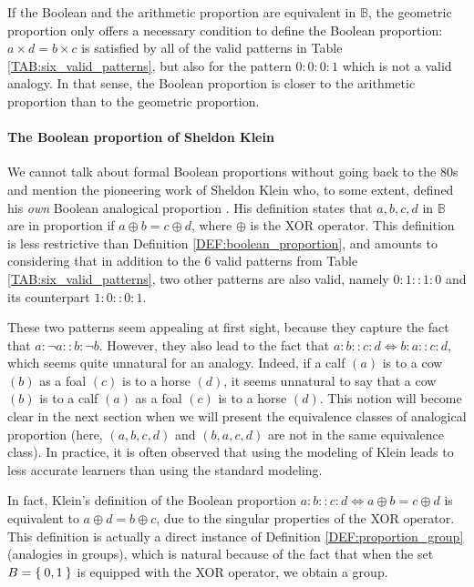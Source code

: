 If the Boolean and the arithmetic proportion are equivalent in $\mathbb{B}$, the
geometric proportion only offers a necessary condition to define the Boolean
proportion: $a \times d = b\times c$ is satisfied by all of the valid patterns
in Table \ref{TAB:six_valid_patterns}, but also for the pattern $0: 0: 0: 1$
which is not a valid analogy. In that sense, the Boolean proportion is closer
to the arithmetic proportion than to the geometric proportion.

\paragraph{The Boolean proportion of Sheldon Klein\\}

We cannot talk about formal Boolean proportions without going back to the 80s
and mention the pioneering work of Sheldon Klein who, to some extent, defined
his \textit{own} Boolean analogical proportion \cite{Kle83}. His definition
states that $a, b, c, d$ in $\mathbb{B}$ are in proportion if $a \oplus b = c
\oplus d$, where $\oplus$ is the XOR operator.  This definition is less
restrictive than Definition \ref{DEF:boolean_proportion}, and amounts to
considering that in addition to the $6$ valid patterns from Table
\ref{TAB:six_valid_patterns}, two other patterns are also valid, namely
$0:1::1:0$ and its counterpart $1:0::0:1$.

These two patterns seem appealing at first sight, because they capture the fact
that $a : \neg a :: b : \neg b$. However, they also lead to the fact that
$a:b::c:d \iff b : a :: c :d$, which seems quite unnatural for an analogy.
Indeed, if a calf $(a)$ is to a cow $(b)$ as a foal $(c)$ is to a horse $(d)$,
it seems unnatural to say that a cow $(b)$ is to a calf $(a)$ as a foal $(c)$
is to a horse $(d)$. This notion will become clear in the next section when we
will present the equivalence classes of analogical proportion (here, $(a, b, c,
d)$ and $(b, a, c, d)$ are not in the same equivalence class).  In practice, it
is often observed that using the modeling of Klein leads to less accurate
learners than using the standard modeling.

In fact, Klein's definition of the Boolean proportion $a:b::c:d \iff a
\oplus b = c \oplus d$ is equivalent to $a \oplus d = b \oplus c$, due to the
singular properties of the XOR operator. This definition is actually a direct
instance of Definition \ref{DEF:proportion_group} (analogies in groups), which
is natural because of the fact that when the set $B = \Set{0, 1}$ is equipped
with the XOR operator, we obtain a group.

